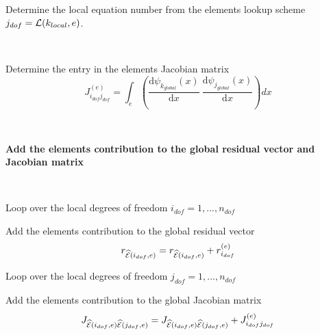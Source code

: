 \begin{DoxyItemize}
\begin{DoxyItemize}
\begin{DoxyItemize}
\begin{longtabu}
\begin{DoxyItemize}
\item Determine the local equation number from the element\textquotesingle{}s lookup scheme $ j_{dof}= {\cal L}(k_{local},e)$.   
\end{DoxyItemize}\\
\end{longtabu}

\begin{DoxyItemize}
\item Determine the entry in the element\textquotesingle{}s Jacobian matrix \[ J_{i_{dof}j_{dof}}^{(e)} = \int_{e} \left( \frac{\mbox{d} \psi_{k_{global}}(x)}{\mbox{d} x} \ \frac{\mbox{d} \psi_{j_{global}}(x)}{\mbox{d} x} \right) dx \]
\end{DoxyItemize}
\end{DoxyItemize}~\newline
 ~\newline
 \begin{center} {\bfseries  Add the element\textquotesingle{}s contribution to the global residual vector and Jacobian matrix } \end{center}  ~\newline

\item Loop over the local degrees of freedom $ i_{dof}=1,...,n_{dof} $
\begin{DoxyItemize}
\item Add the element\textquotesingle{}s contribution to the global residual vector \[ r_{\widehat{\cal E}(i_{dof},e)} = r_{\widehat{\cal E}(i_{dof},e)} + r_{i_{dof}}^{(e)} \]
\item Loop over the local degrees of freedom $ j_{dof}=1,...,n_{dof}$
\begin{DoxyItemize}
\item Add the element\textquotesingle{}s contribution to the global Jacobian matrix \[ J_{\widehat{\cal E}(i_{dof},e)\widehat{\cal E}(j_{dof},e) } = J_{\widehat{\cal E}(i_{dof},e)\widehat{\cal E}(j_{dof},e) } + J_{i_{dof} j_{dof}}^{(e)} \]
\end{DoxyItemize}
\end{DoxyItemize}
\end{DoxyItemize}
\end{DoxyItemize}

